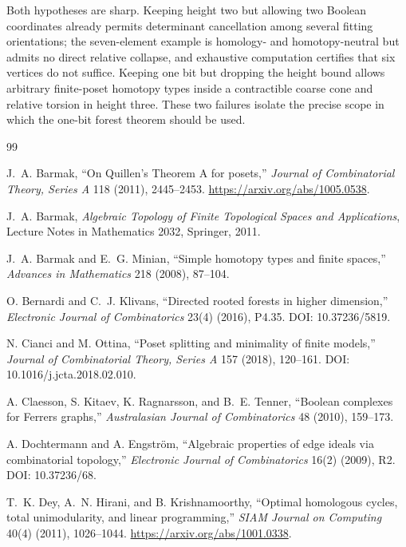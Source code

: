 \documentclass[11pt]{article}
\theoremstyle{definition}
\theoremstyle{remark}
\begin{document}
Both hypotheses are sharp.  Keeping height two but allowing two Boolean coordinates
already permits determinant cancellation among several fitting orientations; the
seven-element example is homology- and homotopy-neutral but admits no direct relative
collapse, and exhaustive computation certifies that six vertices do not suffice.
Keeping one bit but dropping the height bound allows arbitrary finite-poset homotopy
types inside a contractible coarse cone and relative torsion in height three.  These
two failures isolate the precise scope in which the one-bit forest theorem should be
used.

\begin{thebibliography}{99}

J.~A. Barmak,
``On Quillen's Theorem A for posets,''
\emph{Journal of Combinatorial Theory, Series A} 118 (2011), 2445--2453.
\url{https://arxiv.org/abs/1005.0538}.

J.~A. Barmak,
\emph{Algebraic Topology of Finite Topological Spaces and Applications},
Lecture Notes in Mathematics 2032, Springer, 2011.

J.~A. Barmak and E.~G. Minian,
``Simple homotopy types and finite spaces,''
\emph{Advances in Mathematics} 218 (2008), 87--104.

O. Bernardi and C.~J. Klivans,
``Directed rooted forests in higher dimension,''
\emph{Electronic Journal of Combinatorics} 23(4) (2016), P4.35.
DOI: 10.37236/5819.

N. Cianci and M. Ottina,
``Poset splitting and minimality of finite models,''
\emph{Journal of Combinatorial Theory, Series A} 157 (2018), 120--161.
DOI: 10.1016/j.jcta.2018.02.010.

A. Claesson, S. Kitaev, K. Ragnarsson, and B.~E. Tenner,
``Boolean complexes for Ferrers graphs,''
\emph{Australasian Journal of Combinatorics} 48 (2010), 159--173.

A. Dochtermann and A. Engstr\"om,
``Algebraic properties of edge ideals via combinatorial topology,''
\emph{Electronic Journal of Combinatorics} 16(2) (2009), R2.
DOI: 10.37236/68.

T.~K. Dey, A.~N. Hirani, and B. Krishnamoorthy,
``Optimal homologous cycles, total unimodularity, and linear programming,''
\emph{SIAM Journal on Computing} 40(4) (2011), 1026--1044.
\url{https://arxiv.org/abs/1001.0338}.


\end{thebibliography}
\end{document}

